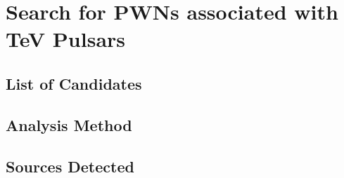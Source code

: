 
\chapter{Search for \acsp{PWN} associated with TeV Pulsars}

\section{List of Candidates}

\section{Analysis Method}

\section{Sources Detected}
